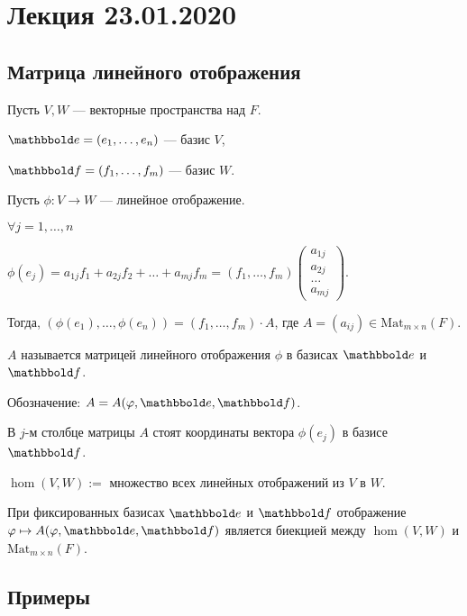\section{Лекция 23.01.2020}

\subsection{Матрица линейного отображения}

Пусть $V, W$ --- векторные пространства над $F$.

$\E = (e_1, \dots, e_n)$ --- базис $V$,

$\F = (f_1, \dots, f_m)$ --- базис $W$.

\bigskip
Пусть $\phi\colon V \to W$ --- линейное отображение.

$\forall j = 1, \dots, n$

$\phi(e_j) = a_{1j} f_1 + a_{2j} f_2 + \dots + a_{mj} f_m = (f_1, \dots, f_m) \begin{pmatrix} a_{1j} \\ a_{2j} \\ \dots \\ a_{mj} \end{pmatrix}$.

Тогда, $(\phi(e_1), \dots, \phi(e_n)) = (f_1, \dots, f_m) \cdot A$, где $A = (a_{ij}) \in \text{Mat}_{m \times n} (F)$.

\begin{definition}
    $A$ называется матрицей линейного отображения $\phi$ в базисах $\E$ и $\F$.

    Обозначение: $A = A(\phi, \E, \F)$.
\end{definition}

В $j$-м столбце матрицы $A$ стоят координаты вектора $\phi(e_j)$ в базисе $\F$.

\begin{designation}
    $\hom(V, W) := $ множество всех линейных отображений из $V$ в $W$.
\end{designation}

\begin{corollary}
    При фиксированных базисах $\E$ и $\F$ отображение $\phi \mapsto A(\phi, \E, \F)$ является биекцией между $\hom(V, W)$ и $\text{Mat}_{m \times n}(F)$.
\end{corollary}


\subsection{Примеры}

